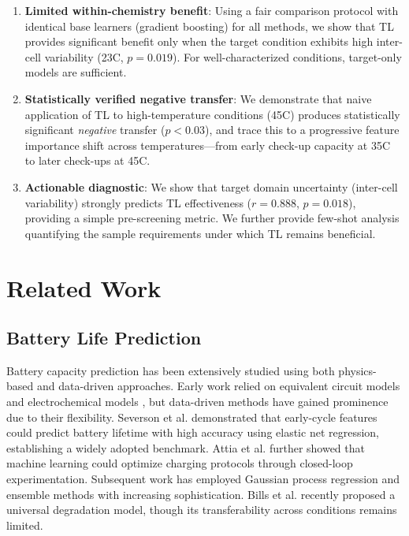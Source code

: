 \documentclass[review]{elsarticle}
\begin{document}
\begin{enumerate}
    \item \textbf{Limited within-chemistry benefit}: Using a fair comparison protocol with identical base learners (gradient boosting) for all methods, we show that TL provides significant benefit only when the target condition exhibits high inter-cell variability (23\textdegree C, $p = 0.019$). For well-characterized conditions, target-only models are sufficient.
    
    \item \textbf{Statistically verified negative transfer}: We demonstrate that naive application of TL to high-temperature conditions (45\textdegree C) produces statistically significant \textit{negative} transfer ($p < 0.03$), and trace this to a progressive feature importance shift across temperatures---from early check-up capacity at 35\textdegree C to later check-ups at 45\textdegree C.
    
    \item \textbf{Actionable diagnostic}: We show that target domain uncertainty (inter-cell variability) strongly predicts TL effectiveness ($r = 0.888$, $p = 0.018$), providing a simple pre-screening metric. We further provide few-shot analysis quantifying the sample requirements under which TL remains beneficial.
\end{enumerate}

\section{Related Work}
\label{sec:related}

\subsection{Battery Life Prediction}

Battery capacity prediction has been extensively studied using both physics-based and data-driven approaches. Early work relied on equivalent circuit models and electrochemical models \cite{birkl2017degradation}, but data-driven methods have gained prominence due to their flexibility. Severson et al. \cite{severson2019data} demonstrated that early-cycle features could predict battery lifetime with high accuracy using elastic net regression, establishing a widely adopted benchmark. Attia et al. \cite{attia2020closed} further showed that machine learning could optimize charging protocols through closed-loop experimentation. Subsequent work has employed Gaussian process regression \cite{richardson2017gaussian} and ensemble methods \cite{roman2021machine} with increasing sophistication. Bills et al. \cite{bills2023universal} recently proposed a universal degradation model, though its transferability across conditions remains limited.
\end{document}
